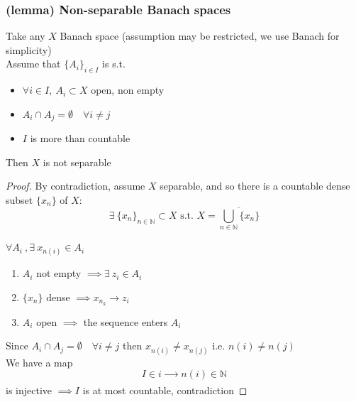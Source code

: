 \subsubsection{(lemma) Non-separable Banach spaces}
Take any $X$ Banach space (assumption may be restricted, we use Banach for simplicity)\\
Assume that $\{A_i\}_{i\in I}$ is s.t.
\begin{itemize}
    \item $\forall i\in I,\ A_i\subset X$ open, non empty
    \item $A_i\cap A_j=\emptyset\quad \forall i\neq j$
    \item $I$ is more than countable
\end{itemize}
Then $X$ is not separable
\begin{proof}
    By contradiction, assume $X$ separable, and so there is a countable dense subset $\{x_n\}$ of $X$:
    $$\exists\ \{x_n\}_{n\in \mathbb N}\subset X\text{ s.t. } X=\overline{\bigcup_{n\in \mathbb N}\{x_n\}}$$
    
    $\forall A_i \ ,\exists\ x_{n(i)}\in A_i$
    \begin{enumerate}
        \item $A_i$ not empty $\implies \exists\ z_i\in A_i$
        \item $\{x_n\}$ dense $\implies x_{n_k}\to z_i$
        \item $A_i$ open $\implies$ the sequence enters $A_i$
    \end{enumerate}
    Since $A_i\cap A_j=\emptyset \quad \forall i\neq j$
    then $x_{n(i)}\neq x_{n(j)}$ i.e. $n(i)\neq n(j)$\\
    We have a map
    $$I\in i \xrightarrow[\quad\quad]{}n(i)\in \mathbb N$$ is injective
    $\implies I$ is at most countable, contradiction
\end{proof}
